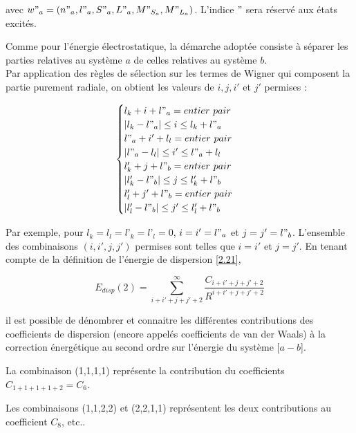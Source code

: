 \documentclass[12pt,a4paper]{book}
\begin{document}
	\noindent avec $w"_{a} = (n"_{a}, l"_{a}, S"_{a}, L"_{a}, M"_{S_{a}}, M"_{L_{a}})$. L'indice \og $"$ \fg{} sera réservé aux états excités. 
	
	Comme pour l'énergie électrostatique, la démarche adoptée consiste à séparer les parties relatives au système $a$ de celles relatives au système $b$. \\
	
	Par application des règles de sélection sur les termes de Wigner qui composent la partie purement radiale, on obtient les valeurs de $i, j, i'$ et $j'$ permises :
	
	\begin{equation}
	\begin{cases}
	l_{k} + i + l"_{a} = entier\ pair \\
	|l_{k} - l"_{a}| \leq i \leq l_{k} + l"_{a} \\
	l"_{a} + i' + l_{l} = entier\ pair \\
	|l"_{a} - l_{l}| \leq i' \leq l"_{a} + l_{l} \\
	l'_{k} + j + l"_{b} = entier\ pair \\
	|l'_{k} - l"_{b}| \leq j \leq l'_{k} + l"_{b} \\
	l'_{l} + j' + l"_{b} = entier\ pair \\
	|l'_{l} - l"_{b}| \leq j' \leq l'_{l} + l"_{b}
	\end{cases}
	\end{equation}
	
	Par exemple, pour $l_{k}=l_{l}=l’_{k}=l’_{l}=0$, $i=i'=l"_{a}$ et $j=j'=l"_{b}$. L'ensemble des combinaisons $(i, i', j, j')$ permises sont telles que $i=i'$ et $j=j'$. En tenant compte de la définition de l'énergie de dispersion \ref{2.21},
	
	\begin{equation}
	E_{disp}(2) = \sum_{i+i'+j+j'+2}^{\infty} \frac{C_{i+i'+j+j'+2}}{R^{i+i'+j+j'+2}}
	\end{equation}
	
	il est possible de dénombrer et connaitre les différentes contributions des coefficients de dispersion (encore appelés coefficients de van der Waals) à la correction énergétique au second ordre sur l'énergie du système [$a - b$].
	
	La combinaison (1,1,1,1) représente la contribution du coefficients $C_{1+1+1+1+2} = C_{6}$.
	
	Les combinaisons (1,1,2,2) et (2,2,1,1) représentent les deux contributions au coefficient $C_{8}$, etc..
	
\end{document}
